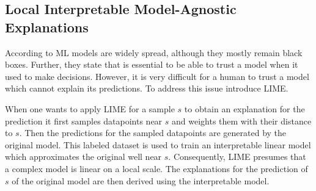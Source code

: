 \subsection{Local Interpretable Model-Agnostic Explanations}
\label{chp:fundamentals:sec:machine_learning:subsec:transfer_learning}
According to \textcite{Ribeiro:2016} \ac{ML} models are widely spread, although they mostly remain black boxes.
Further, they state that is essential to be able to trust a model when it used to make decisions.
However, it is very difficult for a human to trust a model which cannot explain its predictions.
To address this issue \textcite{Ribeiro:2016} introduce \ac{LIME}.

When one wants to apply \ac{LIME} for a sample $s$ to obtain an explanation for the prediction it first samples datapoints near $s$ and weights them with their distance to $s$.
Then the predictions for the sampled datapoints are generated by the original model.
This labeled dataset is used to train an interpretable linear model which approximates the original well near $s$.
Consequently, \ac{LIME} presumes that a complex model is linear on a local scale.
The explanations for the prediction of $s$ of the original model are then derived using the interpretable model. \parencite{Ribeiro:2016}
